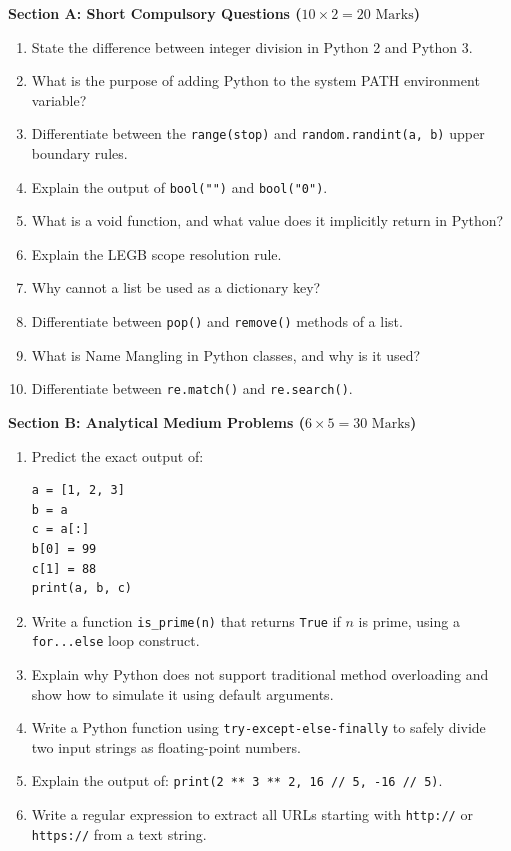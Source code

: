 \begin{mockexam}
\noindent\textbf{Section A: Short Compulsory Questions ($10 \times 2 = 20\text{ Marks}$)}
\begin{enumerate}[leftmargin=1.5em]
    \item State the difference between integer division in Python 2 and Python 3.
    \item What is the purpose of adding Python to the system PATH environment variable?
    \item Differentiate between the \texttt{range(stop)} and \texttt{random.randint(a, b)} upper boundary rules.
    \item Explain the output of \texttt{bool("")} and \texttt{bool("0")}.
    \item What is a void function, and what value does it implicitly return in Python?
    \item Explain the LEGB scope resolution rule.
    \item Why cannot a list be used as a dictionary key?
    \item Differentiate between \texttt{pop()} and \texttt{remove()} methods of a list.
    \item What is Name Mangling in Python classes, and why is it used?
    \item Differentiate between \texttt{re.match()} and \texttt{re.search()}.
\end{enumerate}

\medskip
\noindent\textbf{Section B: Analytical Medium Problems ($6 \times 5 = 30\text{ Marks}$)}
\begin{enumerate}[leftmargin=1.5em, start=11]
    \item Predict the exact output of:
    \begin{lstlisting}[language=Python3]
a = [1, 2, 3]
b = a
c = a[:]
b[0] = 99
c[1] = 88
print(a, b, c)
    \end{lstlisting}
    \item Write a function \texttt{is\_prime(n)} that returns \texttt{True} if $n$ is prime, using a \texttt{for...else} loop construct.
    \item Explain why Python does not support traditional method overloading and show how to simulate it using default arguments.
    \item Write a Python function using \texttt{try-except-else-finally} to safely divide two input strings as floating-point numbers.
    \item Explain the output of: \texttt{print(2 ** 3 ** 2, 16 // 5, -16 // 5)}.
    \item Write a regular expression to extract all URLs starting with \texttt{http://} or \texttt{https://} from a text string.
\end{enumerate}


\end{mockexam}
